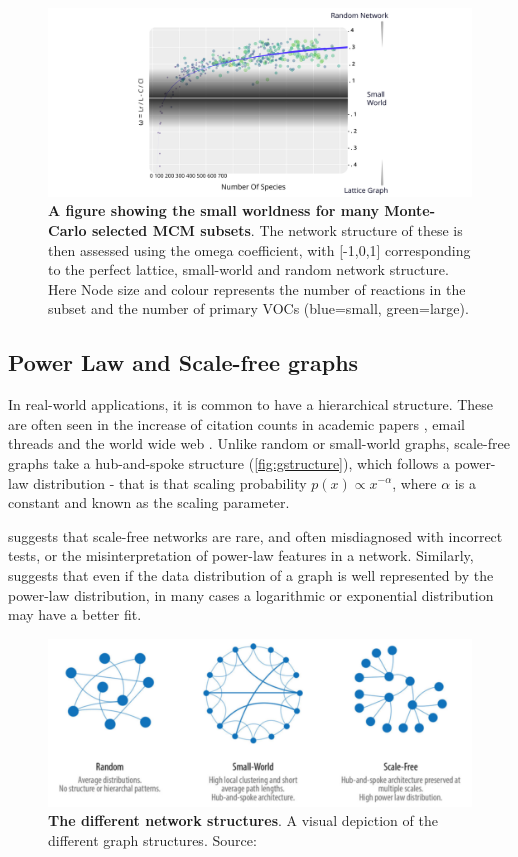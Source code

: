 \begin{figure}[H]
     \centering
         \includegraphics[width=\textwidth]{figures_c3/logpart.pdf}
        \caption{\textbf{A figure showing the small worldness for many Monte-Carlo selected MCM subsets}. The network structure of these is then assessed using the omega coefficient, with [-1,0,1] corresponding to the perfect lattice, small-world and random network structure. Here Node size and colour represents the number of reactions in the subset and the number of primary VOCs (blue=small, green=large).}
        \label{fig:smw}
\end{figure}



\subsection{Power Law and Scale-free graphs}
In real-world applications, it is common to have a hierarchical structure. These are often seen in the increase of citation counts in academic papers \citep{scalefreepapers}, email threads \citep{scalefreeemail} and the world wide web \citep{neoj4}. Unlike random or small-world graphs, scale-free graphs take a hub-and-spoke structure (\autoref{fig:gstructure}), which follows a power-law distribution - that is that scaling probability $p(x) \propto x^{-\alpha}$, where $\alpha$ is a constant and known as the scaling parameter.

\cite{scalefreebad} suggests that scale-free networks are rare, and often misdiagnosed with incorrect tests, or the misinterpretation of power-law features in a network. Similarly, \cite{plexp} suggests that even if the data distribution of a graph is well represented by the power-law distribution, in many cases a logarithmic or exponential distribution may have a better fit. 

\begin{figure}[H]
     \centering
         \includegraphics[width=.8\textwidth]{figures_c3/graphstyles.png}
        \caption{\textbf{The different network structures}. A visual depiction of the different graph structures. Source: \cite{neoj4}}
        \label{fig:gstructure}
\end{figure}

